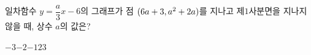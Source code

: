 일차함수 $y=\dfrac{a}{3}x-6$의 그래프가 점 $(6a+3{,}\mkern3mu a^2+2a)$를 지나고 제$1$사분면을 지나지 않을 때, 상수 $a$의 값은?
\begin{choices32}{$-3$}{$-2$}{$-1$}{$2$}{$3$}\end{choices32}
